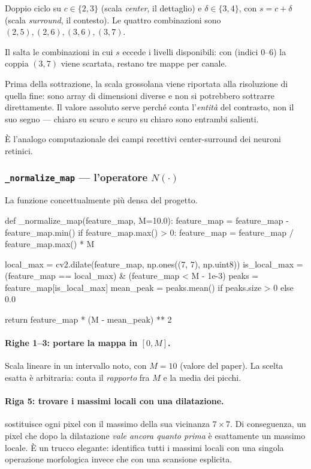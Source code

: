 Doppio ciclo su $c \in \{2,3\}$ (scala \emph{center}, il dettaglio) e $\delta \in \{3,4\}$, con
$s = c + \delta$ (scala \emph{surround}, il contesto). Le quattro combinazioni sono
$(2,5), (2,6), (3,6), (3,7)$.

Il  salta le combinazioni in cui $s$ eccede i livelli disponibili: con
 (indici $0$--$6$) la coppia $(3,7)$ viene scartata, restano tre mappe per
canale.

Prima della sottrazione, la scala grossolana viene riportata alla risoluzione di quella fine:
sono array di dimensioni diverse e non si potrebbero sottrarre direttamente. Il valore assoluto
serve perché conta l'\emph{entità} del contrasto, non il suo segno --- chiaro su scuro e scuro su
chiaro sono entrambi salienti.

È l'analogo computazionale dei campi recettivi center-surround dei neuroni retinici.

\subsubsection{\texttt{\_normalize\_map} --- l'operatore \texorpdfstring{$N(\cdot)$}{N()}}

La funzione concettualmente più densa del progetto.

\begin{idebox}
\begin{pycode}
def _normalize_map(feature_map, M=10.0):
    feature_map = feature_map - feature_map.min()
    if feature_map.max() > 0:
        feature_map = feature_map / feature_map.max() * M

    local_max = cv2.dilate(feature_map, np.ones((7, 7), np.uint8))
    is_local_max = (feature_map == local_max) & (feature_map < M - 1e-3)
    peaks = feature_map[is_local_max]
    mean_peak = peaks.mean() if peaks.size > 0 else 0.0

    return feature_map * (M - mean_peak) ** 2
\end{pycode}
\end{idebox}

\paragraph{Righe 1--3: portare la mappa in $[0, M]$.}
Scala lineare in un intervallo noto, con $M = 10$ (valore del paper). La scelta esatta è
arbitraria: conta il \emph{rapporto} fra $M$ e la media dei picchi.

\paragraph{Riga 5: trovare i massimi locali con una dilatazione.}
 sostituisce ogni pixel con il massimo della sua vicinanza $7\times7$. Di
conseguenza, un pixel che dopo la dilatazione \emph{vale ancora quanto prima} è esattamente un
massimo locale. È un trucco elegante: identifica tutti i massimi locali con una singola
operazione morfologica invece che con una scansione esplicita.

